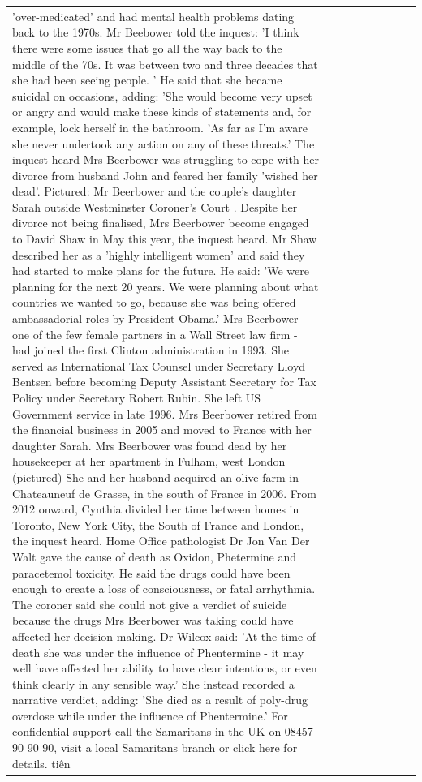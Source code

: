 \begin{table}[H]
\begin{tabular}{lllrlllll}
'over-medicated' and had mental health problems dating back to the 1970s. Mr Beebower told the inquest: 'I think there were some issues that go all the way back to the middle of the 70s. It was between two and three decades that she had been seeing people. ' He said that she became suicidal on occasions, adding: 'She would become very upset or angry and would make these kinds of statements and, for example, lock herself in the bathroom. 'As far as I'm aware she never undertook any action on any of these threats.' The inquest heard Mrs Beerbower was struggling to cope with her divorce from husband John and feared her family 'wished her dead'. Pictured: Mr Beerbower and the couple's daughter Sarah outside Westminster Coroner's Court . Despite her divorce not being finalised, Mrs Beerbower become engaged to David Shaw in May this year, the inquest heard. Mr Shaw described her as a 'highly intelligent women' and said they had started to make plans for the future. He said: 'We were planning for the next 20 years. We were planning about what countries we wanted to go, because she was being offered ambassadorial roles by President Obama.' Mrs Beerbower - one of the few female partners in a Wall Street law firm - had joined the first Clinton administration in 1993. She served as International Tax Counsel under Secretary Lloyd Bentsen before becoming Deputy Assistant Secretary for Tax Policy under Secretary Robert Rubin. She left US Government service in late 1996. Mrs Beerbower retired from the financial business in 2005 and moved to France with her daughter Sarah. Mrs Beerbower was found dead by her housekeeper at her apartment in Fulham, west London (pictured) She and her husband acquired an olive farm in Chateauneuf de Grasse, in the south of France in 2006. From 2012 onward, Cynthia divided her time between homes in Toronto, New York City, the South of France and London, the inquest heard. Home Office pathologist Dr Jon Van Der Walt gave the cause of death as Oxidon, Phetermine and paracetemol toxicity. He said the drugs could have been enough to create a loss of consciousness, or fatal arrhythmia. The coroner said she could not give a verdict of suicide because the drugs Mrs Beerbower was taking could have affected her decision-making. Dr Wilcox said: 'At the time of death she was under the influence of Phentermine - it may well have affected her ability to have clear intentions, or even think clearly in any sensible way.' She instead recorded a narrative verdict, adding: 'She died as a result of poly-drug overdose while under the influence of Phentermine.' For confidential support call the Samaritans in the UK on 08457 90 90 90, visit a local Samaritans branch or click here for details. tiên \\

\end{tabular}
\end{table}
